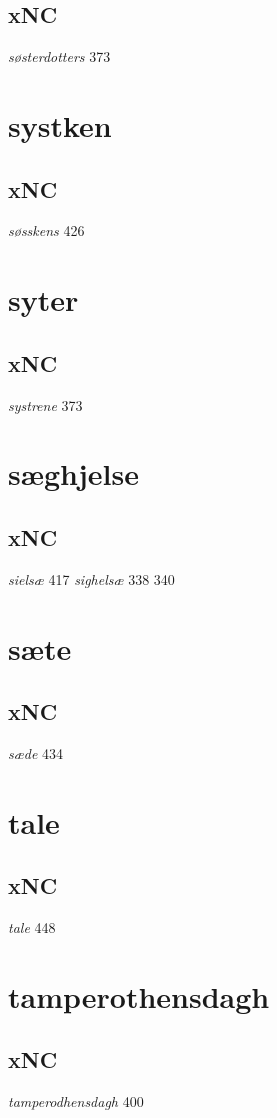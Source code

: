 \documentclass[a4paper,twocolumn]{article}
\begin{document}
\subsection{xNC}
\label{sec:org1b273d7}
\emph{søsterdotters} 373 
\section{systken}
\label{sec:org2486bfb}
\subsection{xNC}
\label{sec:org361f10d}
\emph{søsskens} 426 
\section{syter}
\label{sec:org8648f7b}
\subsection{xNC}
\label{sec:orga7f2768}
\emph{systrene} 373 
\section{sæghjelse}
\label{sec:orgce01d7e}
\subsection{xNC}
\label{sec:org601cba8}
\emph{sielsæ} 417 \emph{sighelsæ} 338 340 
\section{sæte}
\label{sec:orgbba0287}
\subsection{xNC}
\label{sec:orga3b0b5b}
\emph{sæde} 434 
\section{tale}
\label{sec:orgf9a6ebc}
\subsection{xNC}
\label{sec:org9fdbf68}
\emph{tale} 448 
\section{tamperothensdagh}
\label{sec:org96067c2}
\subsection{xNC}
\label{sec:org2b21e32}
\emph{tamperodhensdagh} 400 
\end{document}
